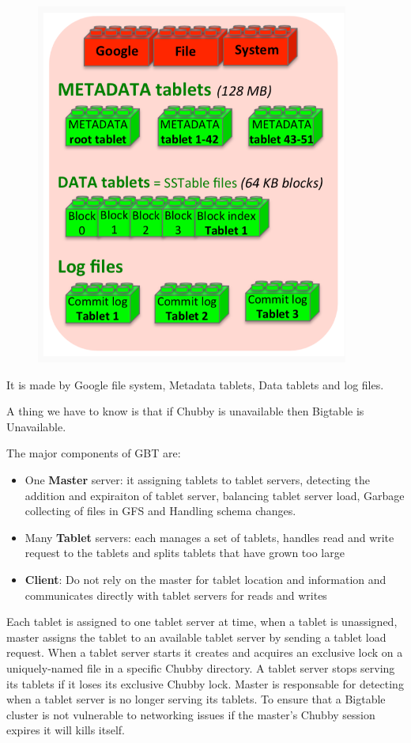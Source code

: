 \begin{figure}[h!]
    \centering
    \includegraphics[scale=0.35]{images/GBTstruct.png}
\end{figure}    

It is made by Google file system, Metadata tablets, Data tablets and log files.


A thing we have to know is that if Chubby is unavailable then Bigtable is Unavailable.

The major components of GBT are:
\begin{itemize}
    \item One \textbf{Master} server: it assigning tablets to tablet servers, detecting the addition and expiraiton of tablet server, balancing tablet server load, Garbage collecting of files in GFS and Handling schema changes.
    \item Many \textbf{Tablet} servers: each manages a set of tablets, handles read and write request to the tablets and splits tablets that have grown too large
    \item \textbf{Client}: Do not rely on the master for tablet location and information and communicates directly with tablet servers for reads and writes
\end{itemize}
Each tablet is assigned to one tablet server at time, when a tablet is unassigned, master assigns the tablet to an available tablet server by sending a tablet load request. When a tablet server starts it creates and acquires an exclusive lock on a uniquely-named file in a specific Chubby directory. A tablet server stops serving its tablets if it loses its exclusive Chubby lock. Master is responsable for detecting when a tablet server is no longer serving its tablets. To ensure that a Bigtable cluster is not vulnerable to networking issues if the master's Chubby session expires it will kills itself.
